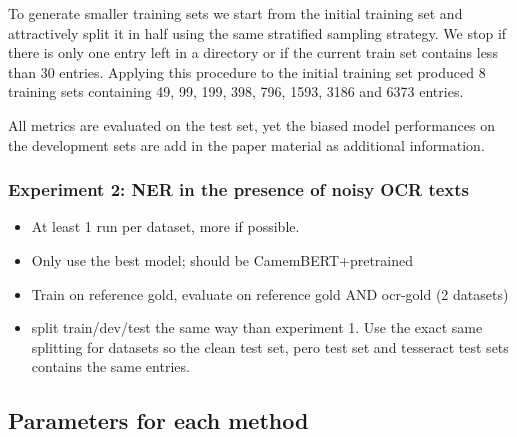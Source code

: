 To generate smaller training sets we start from the initial training set and attractively split it in half using the same stratified sampling strategy.
We stop if there is only one entry left in a directory or if the current train set contains less than 30 entries.
Applying this procedure to the initial training set produced 8 training sets containing 49, 99, 199, 398, 796, 1593, 3186 and 6373 entries.

All metrics are evaluated on the test set, yet the biased model performances on the development sets are add in the paper material as additional information.


\subsubsection{Experiment 2: NER in the presence of noisy OCR texts}

\begin{itemize}
\item At least 1 run per dataset, more if possible.
\item Only use the best model; should be CamemBERT+pretrained
\item Train on reference gold, evaluate on reference gold AND ocr-gold (2 datasets)
\item split train/dev/test the same way than experiment 1. Use the exact same splitting for datasets so the clean test set, pero test set and tesseract test sets contains the same entries.
\end{itemize}
 
 



\subsection{Parameters for each method}

